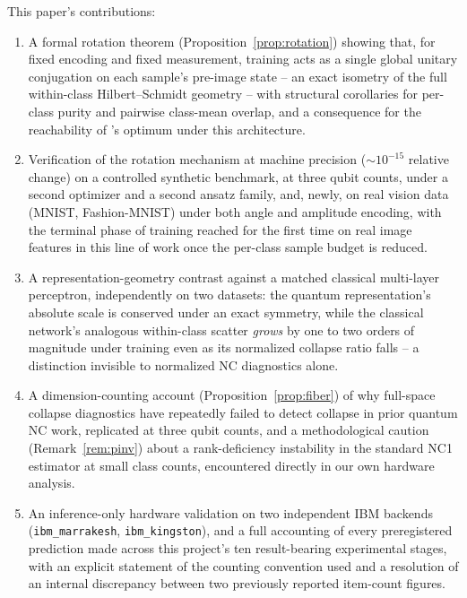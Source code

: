 \documentclass[pdflatex,sn-mathphys-ay]{sn-jnl}
\theoremstyle{thmstyleone}
\theoremstyle{thmstyletwo}
\begin{document}
This paper's contributions:
\begin{enumerate}
\item A formal rotation theorem (Proposition~\ref{prop:rotation}) showing that, for fixed encoding and fixed measurement, training acts as a single global unitary conjugation on each sample's pre-image state -- an exact isometry of the full within-class Hilbert--Schmidt geometry -- with structural corollaries for per-class purity and pairwise class-mean overlap, and a consequence for the reachability of \citeauthor{du2023}'s optimum under this architecture.
\item Verification of the rotation mechanism at machine precision ($\sim 10^{-15}$ relative change) on a controlled synthetic benchmark, at three qubit counts, under a second optimizer and a second ansatz family, and, newly, on real vision data (MNIST, Fashion-MNIST) under both angle and amplitude encoding, with the terminal phase of training reached for the first time on real image features in this line of work once the per-class sample budget is reduced.
\item A representation-geometry contrast against a matched classical multi-layer perceptron, independently on two datasets: the quantum representation's absolute scale is conserved under an exact symmetry, while the classical network's analogous within-class scatter \emph{grows} by one to two orders of magnitude under training even as its normalized collapse ratio falls -- a distinction invisible to normalized NC diagnostics alone.
\item A dimension-counting account (Proposition~\ref{prop:fiber}) of why full-space collapse diagnostics have repeatedly failed to detect collapse in prior quantum NC work, replicated at three qubit counts, and a methodological caution (Remark~\ref{rem:pinv}) about a rank-deficiency instability in the standard NC1 estimator at small class counts, encountered directly in our own hardware analysis.
\item An inference-only hardware validation on two independent IBM backends (\texttt{ibm\_marrakesh}, \texttt{ibm\_kingston}), and a full accounting of every preregistered prediction made across this project's ten result-bearing experimental stages, with an explicit statement of the counting convention used and a resolution of an internal discrepancy between two previously reported item-count figures.
\end{enumerate}
\end{document}
